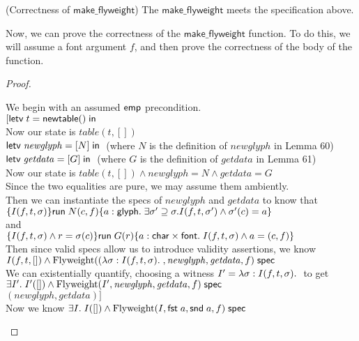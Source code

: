 \begin{lemma}{(Correctness of $\mathsf{make\_flyweight}$)}
  The $\mathsf{make\_flyweight}$ meets the specification above. 
\end{lemma}

Now, we can prove the correctness of the $\mathsf{make\_flyweight}$ function. To do
this, we will assume a font argument $f$, and then prove the correctness of the body
of the function.

\begin{proof}
\begin{tabbedproof}
\oo We begin with an assumed $\mathsf{emp}$ precondition. \\
\oo $[\mathsf{letv}\;t = \mathsf{newtable}()\;\mathsf{in}\;$ \\
\oo Now our state is $\mathit{table}(t, [])$ \\
\oo $\mathsf{letv}\;\mathit{newglyph} = [N]\;\mathsf{in}\;$ (where $N$ is the definition of $\mathit{newglyph}$ in Lemma 60) \\
\oo $\mathsf{letv}\;\mathit{getdata} = [G]\;\mathsf{in}\;$ (where $G$ is the  definition of $\mathit{getdata}$ in Lemma 61)\\
\oo Now our state is $\mathit{table}(t, []) \land \mathit{newglyph} = N \land \mathit{getdata} = G$ \\
\oo Since the two equalities are pure, we may assume them ambiently. \\
\oo Then we can instantiate the specs of $\mathit{newglyph}$ and $\mathit{getdata}$ to know that\\
\oo $\{{I(f, t, \sigma)}\}{\mathsf{run}\;N(c,f)}\{{a:\mathsf{glyph}}.\;{\exists \sigma' \supseteq \sigma. I(f, t, \sigma') \land \sigma'(c) = a}\}$\\
\oo and \\
\oo $\{{I(f, t, \sigma) \land r = \sigma(c)}\}{\mathsf{run}\;G(r)}\{{a:\mathsf{char} \times \mathsf{font}}.\;{I(f, t, \sigma) \land a = (c, f)}\}$\\
\oo Then since valid specs allow us to introduce validity assertions, we know  \\
\ox $I(f, t, []) \land {\mbox{Flyweight}((\lambda \sigma:I(f,t,\sigma).\;, \mathit{newglyph}, \mathit{getdata}, f)}\;\mathsf{spec}$  \\
\oo We can existentially quantify, choosing a witness $I' = \fun{\sigma}{I(f,t,\sigma)}$ to get \\
\ox $\exists I'.\; I'([]) \land {\mbox{Flyweight}(I', \mathit{newglyph}, \mathit{getdata}, f)}\;\mathsf{spec}$  \\
\oo $(\mathit{newglyph}, \mathit{getdata})]$\\
\oo Now we know $\exists I.\;I([]) \land {\mbox{Flyweight}(I, \mathsf{fst}\; a, \mathsf{snd}\; a, f)}\;\mathsf{spec}$\\
\end{tabbedproof}
\end{proof}

